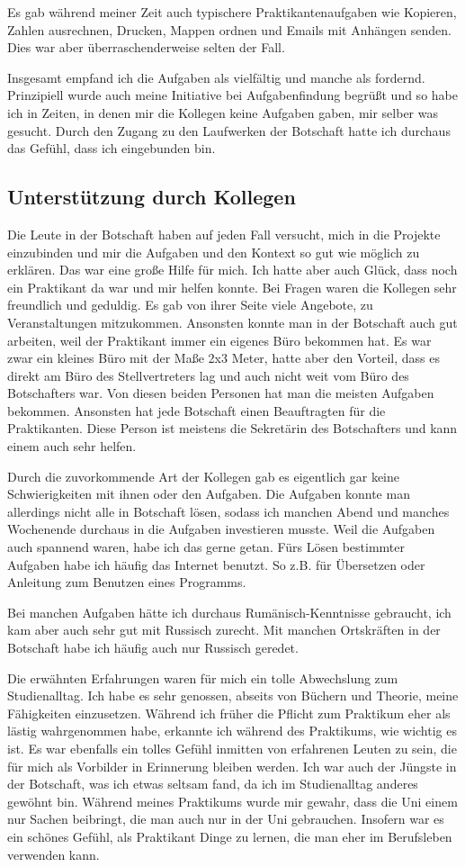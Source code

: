 \documentclass[12pt,a4paper, headsepline]{scrartcl}
\begin{document}
Es gab während meiner Zeit auch typischere Praktikantenaufgaben wie Kopieren, Zahlen ausrechnen, Drucken, Mappen ordnen und Emails mit Anhängen senden. Dies war aber überraschenderweise selten der Fall.

Insgesamt empfand ich die Aufgaben als vielfältig und manche als fordernd. Prinzipiell wurde auch meine Initiative bei Aufgabenfindung begrüßt und so habe ich in Zeiten, in denen mir die Kollegen keine Aufgaben gaben, mir selber was gesucht. Durch den Zugang zu den Laufwerken der Botschaft hatte ich durchaus das Gefühl, dass ich eingebunden bin.

\subsection{Unterstützung durch Kollegen}
Die Leute in der Botschaft haben auf jeden Fall versucht, mich in die Projekte einzubinden und mir die Aufgaben und  den Kontext so gut wie möglich zu erklären. Das war eine große Hilfe für mich. Ich hatte aber auch Glück, dass noch ein Praktikant da war und mir helfen konnte. Bei Fragen waren die Kollegen sehr freundlich und geduldig. Es gab von ihrer Seite viele Angebote, zu Veranstaltungen mitzukommen. Ansonsten konnte man in der Botschaft auch gut arbeiten, weil der Praktikant immer ein eigenes Büro bekommen hat. Es war zwar ein kleines Büro mit der Maße 2x3 Meter, hatte aber den Vorteil, dass es direkt am Büro des Stellvertreters lag und auch nicht weit vom Büro des Botschafters war. Von diesen beiden Personen hat man die meisten Aufgaben bekommen.
Ansonsten hat jede Botschaft einen Beauftragten für die Praktikanten. Diese Person ist meistens die Sekretärin des Botschafters und kann einem auch sehr helfen. 

Durch die zuvorkommende Art der Kollegen gab es eigentlich gar keine Schwierigkeiten mit ihnen oder den Aufgaben. Die Aufgaben konnte man allerdings nicht alle in Botschaft lösen, sodass ich manchen Abend und manches Wochenende durchaus in die Aufgaben investieren musste. Weil die Aufgaben auch spannend waren, habe ich das gerne getan. Fürs Lösen bestimmter Aufgaben habe ich häufig das Internet benutzt. So z.B. für Übersetzen oder Anleitung zum Benutzen eines Programms.

Bei manchen Aufgaben hätte ich durchaus Rumänisch-Kenntnisse gebraucht, ich kam aber auch sehr gut mit Russisch zurecht. Mit manchen Ortskräften in der Botschaft habe ich häufig auch nur Russisch geredet.

Die erwähnten Erfahrungen waren für mich ein tolle Abwechslung zum Studienalltag. Ich habe es sehr genossen, abseits von Büchern und Theorie, meine Fähigkeiten einzusetzen. Während ich früher die Pflicht zum Praktikum eher als lästig wahrgenommen habe, erkannte ich während des Praktikums, wie wichtig es ist. Es war ebenfalls ein tolles Gefühl inmitten von erfahrenen Leuten zu sein, die für mich als Vorbilder in Erinnerung bleiben werden. Ich war auch der Jüngste in der Botschaft, was ich etwas seltsam fand, da ich im Studienalltag anderes gewöhnt bin. Während meines Praktikums wurde mir gewahr, dass die Uni einem nur Sachen beibringt, die man auch nur in der Uni gebrauchen. Insofern war es ein schönes Gefühl, als Praktikant Dinge zu lernen, die man eher im Berufsleben verwenden kann.
\end{document}
